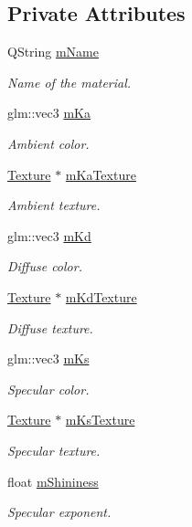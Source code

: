 \subsection*{Private Attributes}
\begin{DoxyCompactItemize}
\item 
Q\+String \hyperlink{class_material_ad5159e4b688f64541c38686c8a79b75a}{m\+Name}
\begin{DoxyCompactList}\small\item\em Name of the material. \end{DoxyCompactList}\item 
glm\+::vec3 \hyperlink{class_material_a16630877735280179accbacf77276e07}{m\+Ka}
\begin{DoxyCompactList}\small\item\em Ambient color. \end{DoxyCompactList}\item 
\hyperlink{class_texture}{Texture} $\ast$ \hyperlink{class_material_ad9c856c3be629bfe3399ab32abdc83bc}{m\+Ka\+Texture}
\begin{DoxyCompactList}\small\item\em Ambient texture. \end{DoxyCompactList}\item 
glm\+::vec3 \hyperlink{class_material_ad19d4445f12608edad69831c54a5f824}{m\+Kd}
\begin{DoxyCompactList}\small\item\em Diffuse color. \end{DoxyCompactList}\item 
\hyperlink{class_texture}{Texture} $\ast$ \hyperlink{class_material_a50a88a1bc4f43f5862d55b93222311b9}{m\+Kd\+Texture}
\begin{DoxyCompactList}\small\item\em Diffuse texture. \end{DoxyCompactList}\item 
glm\+::vec3 \hyperlink{class_material_aa35981fa68220b6495870cc6922fc1a8}{m\+Ks}
\begin{DoxyCompactList}\small\item\em Specular color. \end{DoxyCompactList}\item 
\hyperlink{class_texture}{Texture} $\ast$ \hyperlink{class_material_a7aec39ec8d8bc9531a68c0f2773aaece}{m\+Ks\+Texture}
\begin{DoxyCompactList}\small\item\em Specular texture. \end{DoxyCompactList}\item 
float \hyperlink{class_material_a70469d49d71a60187066ccfc486a18c7}{m\+Shininess}
\begin{DoxyCompactList}\small\item\em Specular exponent. \end{DoxyCompactList}\end{DoxyCompactItemize}


